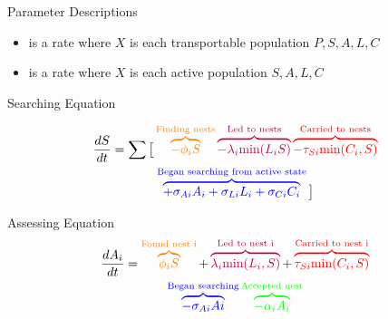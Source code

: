 \documentclass{beamer}
\makeatletter
\def\mcolor#1#{\@mcolor{#1}}
\def\@mcolor#1#2#3{%
  \protect\leavevmode
  \begingroup
    \color#1{#2}#3%
  \endgroup
}
\newcommand{\annotate}[3]{
\mcolor{#1}{\overbrace{#3}^\text{#2}}
}
\makeatother
\begin{document}
\begin{frame}{Parameter Descriptions} 
    \begin{itemize}
        \item {} is a  rate where $X$ is each transportable population ${P, S, A, L, C}$

        \item {} is a  rate where $X$ is each active population ${S, A, L, C}$
    \end{itemize}

\end{frame}

\begin{frame}{Searching Equation}

\begin{multline}
    \frac{dS}{dt} = \sum \big[\annotate{orange}{Finding nests}{- \phi_iS} \annotate{purple}{Led to nests}{- \lambda_i\text{min}(L_iS)} \annotate{red}{Carried to nests}{- \tau_{Si}\text{min}(C_i, S)} \\ \annotate{blue}{Began searching from active state}{+ \sigma_{Ai}A_i + \sigma_{Li}L_i + \sigma_{Ci}C_i} \big]
\end{multline}


\end{frame}

\begin{frame}{Assessing Equation}
\begin{multline}
    \frac{dA_i}{dt} = \annotate{orange}{Found nest i}{\phi_iS} + \annotate{purple}{Led to nest i}{\lambda_i\text{min}(L_i, S)} + \annotate{red}{Carried to nest i}{\tau_{Si}\text{min}(C_i, S)} \\  \annotate{blue}{Began searching}{- \sigma_{Ai}Ai} \annotate{green}{Accepted nest}{- \alpha_iA_i}
\end{multline}

% 

\end{frame}
\end{document}
